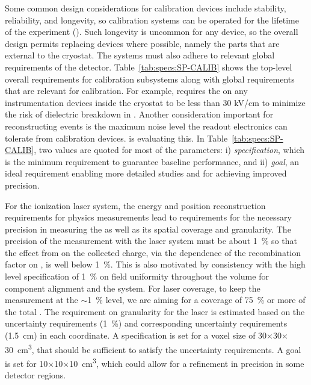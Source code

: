 

Some common design considerations for calibration devices include stability, reliability, and longevity, so calibration systems can be operated for the lifetime of the experiment (\dunelifetime). Such longevity is uncommon for any device, so the overall design permits replacing devices where possible, namely the parts that are external to the cryostat. The systems must also adhere to relevant global requirements of the  detector. Table~\ref{tab:specs:SP-CALIB} shows the top-level overall requirements for calibration subsystems along with global  requirements that are relevant for calibration. For example,  requires the \efield  on any instrumentation devices inside the cryostat to be less than 30 kV/cm to minimize the risk of dielectric breakdown in . Another consideration important for reconstructing events is the maximum noise level the readout electronics can tolerate from calibration devices.  is evaluating this. In Table~\ref{tab:specs:SP-CALIB}, two values are quoted for most of the parameters: i) {\it specification}, which is the minimum requirement to guarantee baseline performance, and ii) {\it goal}, an ideal requirement enabling more detailed studies and for achieving improved precision.

For the ionization laser system, the energy and position reconstruction requirements for physics measurements lead to requirements for the necessary precision in measuring the  \efield as well as its spatial coverage and granularity. The precision of the \efield measurement with the laser system must be about \SI{1}{\%} so that the effect from \efield on the collected charge, via the dependence of the recombination factor on \efield, is well below \SI{1}{\%}. This is also motivated by consistency with the high level  specification of \SI{1}{\%} on field uniformity throughout the volume for component alignment and the  system. For laser coverage, to keep the \efield measurement at the $\sim$\SI{1}{\%} level, we are aiming for a coverage of \SI{75}{\%} or more of the total . The requirement on granularity for the laser is estimated based on the  uncertainty requirements (\SI{1}{\%}) and corresponding uncertainty requirements (\SI{1.5}{\cm}) in each coordinate. A specification is set for a voxel size of \num{30}$\times$\num{30}$\times$\SI{30}{\cubic\cm}, that should be sufficient to satisfy the  uncertainty requirements. A goal is set for \num{10}$\times$\num{10}$\times$\SI{10}{\cubic\cm}, which could allow for a refinement in precision in some detector regions. 

